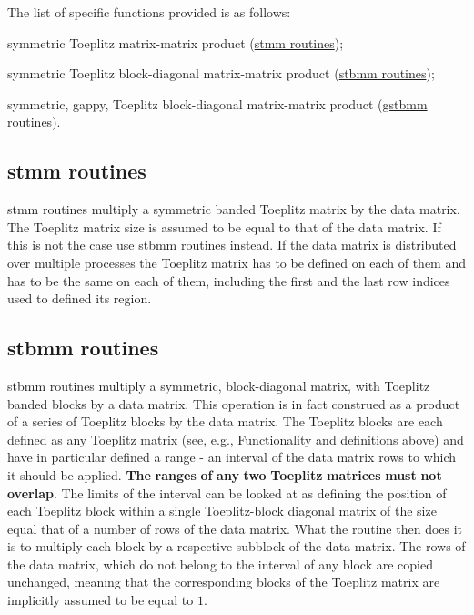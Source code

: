 The list of specific functions provided is as follows\-: \begin{DoxyItemize}
\item symmetric Toeplitz matrix-\/matrix product (\hyperlink{toeplitz_funct_stmm}{stmm routines}); \item symmetric Toeplitz block-\/diagonal matrix-\/matrix product (\hyperlink{toeplitz_funct_stbmm}{stbmm routines}); \item symmetric, gappy, Toeplitz block-\/diagonal matrix-\/matrix product (\hyperlink{toeplitz_funct_gstbmm}{gstbmm routines}). \end{DoxyItemize}
\hypertarget{toeplitz_funct_stmm}{}\subsection{stmm routines}\label{toeplitz_funct_stmm}
{\ttfamily stmm} routines multiply a symmetric banded Toeplitz matrix by the data matrix. The Toeplitz matrix size is assumed to be equal to that of the data matrix. If this is not the case use {\ttfamily stbmm} routines instead. If the data matrix is distributed over multiple processes the Toeplitz matrix has to be defined on each of them and has to be the same on each of them, including the first and the last row indices used to defined its region. \hypertarget{toeplitz_funct_stbmm}{}\subsection{stbmm routines}\label{toeplitz_funct_stbmm}
{\ttfamily stbmm} routines multiply a symmetric, block-\/diagonal matrix, with Toeplitz banded blocks by a data matrix. This operation is in fact construed as a product of a series of Toeplitz blocks by the data matrix. The Toeplitz blocks are each defined as any Toeplitz matrix (see, e.\-g., \hyperlink{toeplitz_functionality}{Functionality and definitions} above) and have in particular defined a range -\/ an interval of the data matrix rows to which it should be applied. {\bfseries The} {\bfseries ranges} {\bfseries of} {\bfseries any} {\bfseries two} {\bfseries Toeplitz} {\bfseries matrices} {\bfseries must} {\bfseries not} {\bfseries overlap}. The limits of the interval can be looked at as defining the position of each Toeplitz block within a single Toeplitz-\/block diagonal matrix of the size equal that of a number of rows of the data matrix. What the routine then does it is to multiply each block by a respective subblock of the data matrix. The rows of the data matrix, which do not belong to the interval of any block are copied unchanged, meaning that the corresponding blocks of the Toeplitz matrix are implicitly assumed to be equal to $ 1 $.

